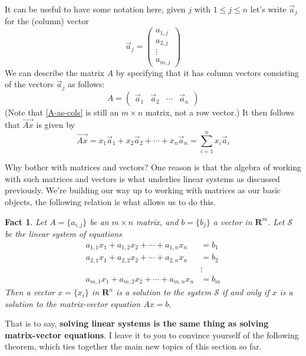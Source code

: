 \documentclass[12pt]{article}
\numberwithin{equation}{subsection}
\numberwithin{figure}{subsection}
\newtheorem{fact}[subsection]{Fact}
\theoremstyle{note}
\begin{document}
It can be useful to have some notation here, given $j$ with $1\leq j \leq n$ let's write $\vec{a}_j$ for the (column) vector \[ \vec{a}_j=\begin{pmatrix} a_{1,j} \\ a_{2,j} \\ \vdots \\ a_{m, j} \end{pmatrix}\] We can describe the matrix $A$ by specifying that it has column vectors consisting of the vectors $\vec{a}_j$ as follows: \begin{equation} \label{A-as-cols} A= \begin{pmatrix} \vec{a}_1 & \vec{a}_2 & \cdots & \vec{a}_n\end{pmatrix} \end{equation}
(Note that \eqref{A-as-cols} is still an $m\times n$ matrix, not a row vector.) It then follows that $\vec{Ax}$ is given by \[ \vec{Ax}=x_1 \vec{a}_1+x_2 \vec{a}_2 +\cdots +x_n\vec{a}_n=\sum_{i=1}^n x_i\vec{a}_i\]

Why bother with matrices and vectors? One reason is that the algebra of working with such matrices and vectors is what underlies linear systems as discussed previously. We're building our way up to working with matrices as our basic objects, the following relation is what allows us to do this. 

\begin{fact} \label{fact-linear-sys-vec}
Let $A=\{a_{i,j}\}$ be an $m\times n$ matrix, and ${b}=\{b_j\}$ a vector in $\mathbf{R}^m$. Let $\mathcal{S}$ be the linear system of equations \begin{align*} 
a_{1,1}x_1+a_{1,2}x_2+\cdots + a_{1,n}x_n&=b_1 \nonumber \\
a_{2,1}x_1+a_{2,2}x_2+\cdots + a_{2,n}x_n&=b_2 \nonumber \\ 
 &\vdots \nonumber  \\
a_{m,1}x_1+a_{m,2}x_2+\cdots + a_{m,n}x_n&=b_m \end{align*}
Then a vector ${x}=\{x_i\}$ in $\mathbf{R}^n$ is a solution to the system $\mathcal{S}$ if and only if ${x}$ is a solution to the matrix-vector equation ${Ax}={b}$.
\end{fact}	

That is to say, \textbf{solving linear systems is the same thing as solving matrix-vector equations}. %
I leave it to you to convince yourself of the following theorem, which ties together the main new topics of this section so far.
\end{document}
